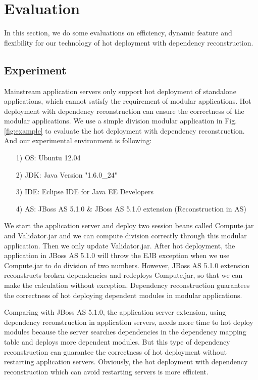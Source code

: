 \documentclass[conference]{IEEEtran}
\begin{document}


\section{Evaluation\label{sec:evaluation}}
In this section, we do some evaluations on efficiency, dynamic feature and flexibility for our technology of hot deployment with dependency reconstruction.

\subsection{Experiment}
Mainstream application servers only support hot deployment of standalone applications, which cannot satisfy the requirement of modular applications.
Hot deployment with dependency reconstruction can ensure the correctness of the modular applications.
We use a simple division modular application in Fig. \ref{fig:example} to evaluate the hot deployment with dependency reconstruction.
And our experimental environment is following:
\begin{itemize}[]
\item[1)] OS: Ubuntu 12.04
\item[2)] JDK: Java Version "1.6.0\_24"
\item[3)] IDE: Eclipse IDE for Java EE Developers
\item[4)] AS: JBoss AS 5.1.0 \& JBoss AS 5.1.0 extension (Reconstruction in AS)
\end{itemize}

We start the application server and deploy two session beans called Compute.jar and Validator.jar and we can compute division correctly through this modular application.
Then we only update Validator.jar.
After hot deployment, the application in JBoss AS 5.1.0 will throw the EJB exception when we use Compute.jar to do division of two numbers.
However, JBoss AS 5.1.0 extension reconstructs broken dependencies and redeploys Compute.jar, so that we can make the calculation without exception.
Dependency reconstruction guarantees the correctness of hot deploying dependent modules in modular applications.

Comparing with JBoss AS 5.1.0, the application server extension, using dependency reconstruction in application servers, needs more time to hot deploy modules because the server searches dependencies in the dependency mapping table and deploys more dependent modules.
But this type of dependency reconstruction can guarantee the correctness of hot deployment without restarting application servers.
Obviously, the hot deployment with dependency reconstruction which can avoid restarting servers is more efficient.
\end{document}

